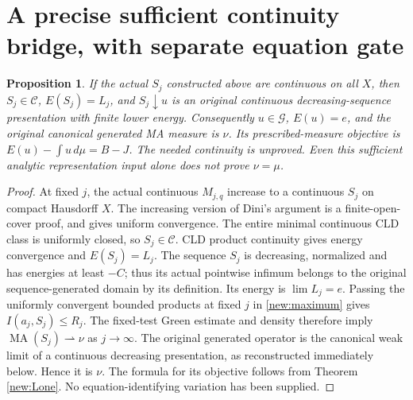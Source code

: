 \documentclass[11pt]{article}
\newtheorem{proposition}[theorem]{Proposition}
\newcommand{\MA}{\operatorname{MA}}
\newcommand{\C}{\mathcal C}
\begin{document}
\section{A precise sufficient continuity bridge, with separate equation gate}
\begin{proposition}\label{new:bridge}
If the actual $S_j$ constructed above are continuous on all $X$, then
$S_j\in\C$, $E(S_j)=L_j$, and $S_j\downarrow u$ is an original
continuous decreasing-sequence presentation with finite lower energy.
Consequently $u\in\mathcal G$, $E(u)=e$, and the original canonical
generated MA measure is $\nu$. Its prescribed-measure objective is
$E(u)-\int u\,d\mu=B-J$.
The needed continuity is unproved. Even this sufficient analytic
representation input alone does not prove $\nu=\mu$.
\end{proposition}
\begin{proof}
At fixed $j$, the actual continuous $M_{j,q}$ increase to a continuous
$S_j$ on compact Hausdorff $X$. The increasing version of Dini's
argument is a finite-open-cover proof, and gives uniform convergence.
The entire minimal continuous CLD class is uniformly closed, so
$S_j\in\C$. CLD product continuity gives energy convergence and
$E(S_j)=L_j$. The sequence $S_j$ is decreasing, normalized and has
energies at least $-C$; thus its actual pointwise infimum belongs to
the original sequence-generated domain by its definition. Its energy
is $\lim L_j=e$. Passing the uniformly convergent bounded products
at fixed $j$ in \eqref{new:maximum} gives $I(a_j,S_j)\le R_j$.
The fixed-test Green estimate and density therefore imply
$\MA(S_j)\rightharpoonup\nu$ as $j\to\infty$. The original generated
operator is the canonical weak limit of a continuous decreasing
presentation, as reconstructed immediately below. Hence it is $\nu$.
The formula for its objective follows from Theorem \ref{new:Lone}.
No equation-identifying variation has been supplied.
\end{proof}
\end{document}
